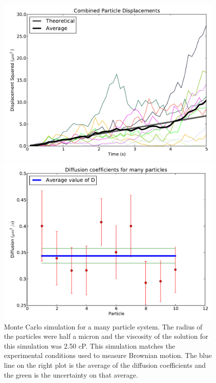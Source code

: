 \documentclass[11pt,letterpaper]{article}
\begin{document}
\begin{figure}
    \centering
    \begin{minipage}[t]{0.485\textwidth}
        \centering
        \includegraphics[width=\textwidth]{figures/many_particles_dispsq.pdf}
    \end{minipage}
    \begin{minipage}[t]{0.485\textwidth}
        \centering
        \includegraphics[width=\textwidth]{figures/many_particles_coef.pdf}
    \end{minipage}
    \caption{Monte Carlo simulation for a many particle system. The radius of
    the particles were half a micron and the viscosity of the solution for this
    simulation was 2.50 cP. This simulation matches the experimental conditions
    used to measure Brownian motion. The blue line on the right plot is the
    average of the diffusion coefficients and the green is the uncertainty on
    that average.}
    \label{many_particles_sim}
\end{figure}
\end{document}
